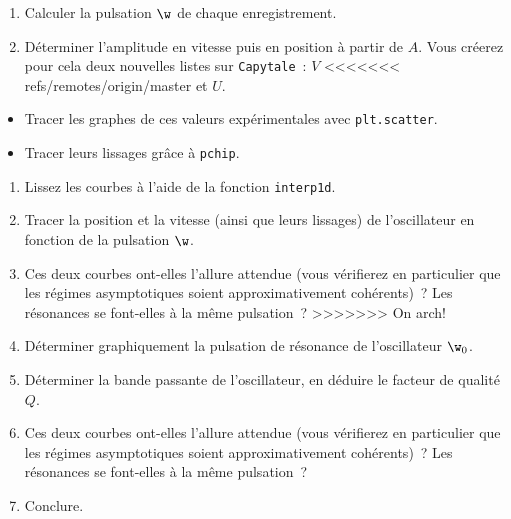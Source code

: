 \documentclass[a4paper, 11pt, final, garamond]{book}
\begin{document}
\begin{enumerate}[label=\sqenumi, start=7]
    \item Calculer la pulsation $\w$ de chaque enregistrement.
    \item Déterminer l'amplitude en vitesse puis en position à partir de $A$.
        Vous créerez pour cela deux nouvelles listes sur \texttt{Capytale}~: $V$
<<<<<<< refs/remotes/origin/master
        et $U$.
\end{enumerate}
\begin{itemize}
    \item Tracer les graphes de ces valeurs expérimentales avec
        \texttt{plt.scatter}.
    \item Tracer leurs lissages grâce à \texttt{pchip}.
\end{itemize}
\begin{enumerate}[label=\sqenumi, resume]
=======
        et $Z$.
    \item Lissez les courbes à l'aide de la fonction \texttt{interp1d}.
    \item Tracer la position et la vitesse (ainsi que leurs lissages) de
        l'oscillateur en fonction de la pulsation $\w$.
    \item Ces deux courbes ont-elles l'allure attendue (vous vérifierez en
        particulier que les régimes asymptotiques soient approximativement
        cohérents)~? Les résonances se font-elles à la même pulsation~?
>>>>>>> On arch!
    \item Déterminer graphiquement la pulsation de résonance de l'oscillateur
        $\w_0$.
    \item Déterminer la bande passante de l'oscillateur, en déduire le facteur
        de qualité $Q$.
    \item Ces deux courbes ont-elles l'allure attendue (vous vérifierez en
        particulier que les régimes asymptotiques soient approximativement
        cohérents)~? Les résonances se font-elles à la même pulsation~?
    \item Conclure.
\end{enumerate}
\end{document}
